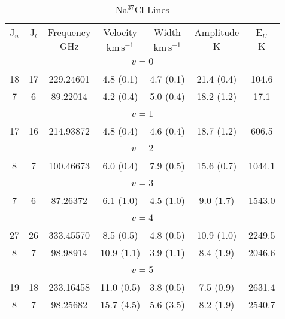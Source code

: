 \begin{table*}[htp]
\centering
\caption{Na$^{37}$Cl Lines}
\begin{tabular}{ccccccc}
\label{tab:Na37Cl_salt_lines}
 J$_u$ & J$_l$ & Frequency & Velocity & Width & Amplitude & E$_U$ \\
  &  & $\mathrm{GHz}$ & $\mathrm{km\,s^{-1}}$ & $\mathrm{km\,s^{-1}}$ & $\mathrm{K}$ & $\mathrm{K}$ \\
\hline
&\vspace{-0.75em}\\
\multicolumn{7}{c}{$v = 0$} \\
\vspace{-0.75em}\\
 18 & 17 & 229.24601 & 4.8 (0.1) & 4.7 (0.1) & 21.4 (0.4) & 104.6 \\
 7 & 6 & 89.22014 & 4.2 (0.4) & 5.0 (0.4) & 18.2 (1.2) & 17.1 \\
&\vspace{-0.75em}\\
\multicolumn{7}{c}{$v = 1$} \\
\vspace{-0.75em}\\
 17 & 16 & 214.93872 & 4.8 (0.4) & 4.6 (0.4) & 18.7 (1.2) & 606.5 \\
&\vspace{-0.75em}\\
\multicolumn{7}{c}{$v = 2$} \\
\vspace{-0.75em}\\
 8 & 7 & 100.46673 & 6.0 (0.4) & 7.9 (0.5) & 15.6 (0.7) & 1044.1 \\
&\vspace{-0.75em}\\
\multicolumn{7}{c}{$v = 3$} \\
\vspace{-0.75em}\\
 7 & 6 & 87.26372 & 6.1 (1.0) & 4.5 (1.0) & 9.0 (1.7) & 1543.0 \\
&\vspace{-0.75em}\\
\multicolumn{7}{c}{$v = 4$} \\
\vspace{-0.75em}\\
 27 & 26 & 333.45570 & 8.5 (0.5) & 4.8 (0.5) & 10.9 (1.0) & 2249.5 \\
 8 & 7 & 98.98914 & 10.9 (1.1) & 3.9 (1.1) & 8.4 (1.9) & 2046.6 \\
&\vspace{-0.75em}\\
\multicolumn{7}{c}{$v = 5$} \\
\vspace{-0.75em}\\
 19 & 18 & 233.16458 & 11.0 (0.5) & 3.8 (0.5) & 7.5 (0.9) & 2631.4 \\
 8 & 7 & 98.25682 & 15.7 (4.5) & 5.6 (3.5) & 8.2 (1.9) & 2540.7 \\
\hline
\end{tabular}

\par 
\end{table*}
